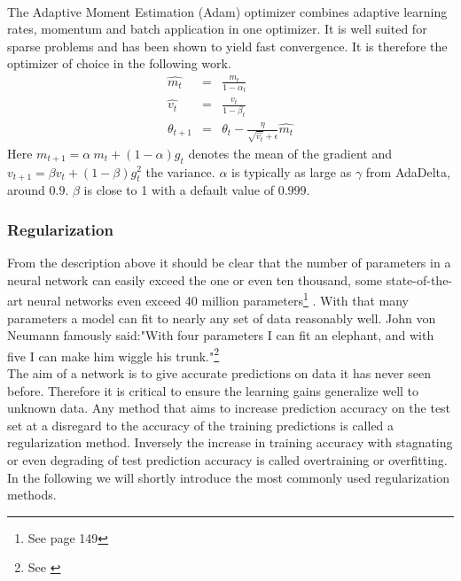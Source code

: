 				~\\
				The Adaptive Moment Estimation (Adam) optimizer combines adaptive learning rates, momentum and batch application in one optimizer. It is well suited for sparse problems and has been shown to yield fast convergence. It is therefore the optimizer of choice in the following work.
				\begin{eqnarray}
					\hat{m_t} & = & \frac{m_t}{1-\alpha_t}\\
					\hat{v_t} & = & \frac{v_t}{1-\beta_t} \\
					\theta_{t+1} & = & \theta_{t} - \frac{\eta}{\sqrt{\hat{v_t}}+\epsilon}\hat{m_t}
				\end{eqnarray}
				Here $m_{t+1} = \alpha \: m_t + (1-\alpha)g_t$ denotes the mean of the gradient and $v_{t+1} = \beta v_t + (1-\beta)g^2_t$ the variance. $\alpha$ is typically as large as $\gamma$ from AdaDelta, around $0.9$. $\beta$ is close to 1 with a default value of $0.999$. 
			\subsubsection{Regularization}
				From the description above it should be clear that the number of parameters in a neural network can easily exceed the one or even ten thousand, some state-of-the-art neural networks even exceed 40 million parameters\footnote{See \cite{BookMultimediaModeling} page 149} . With that many parameters a model can fit to nearly any set of data reasonably well. John von Neumann famously said:"With four parameters I can fit an elephant, and with five I can make him wiggle his trunk."\footnote{See \cite{NNElephant}}\\
				The aim of a network is to give accurate predictions on data it has never seen before. Therefore it is critical to ensure the learning gains generalize well to unknown data. Any method that aims to increase prediction accuracy on the test set at a disregard to the accuracy of the training predictions is called a regularization method. Inversely the increase in training accuracy with stagnating or even degrading of test prediction accuracy is called overtraining or overfitting.\\
				In the following we will shortly introduce the most commonly used regularization methods.

